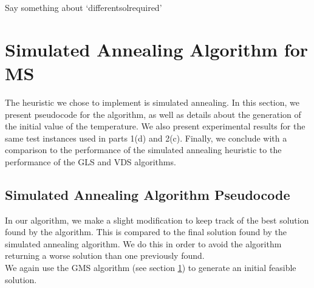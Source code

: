 \documentclass[12pt,a4paper,reqno]{article}
\begin{document}
Say something about `differentsolrequired'

\section{Simulated Annealing Algorithm for MS}

The heuristic we chose to implement is simulated annealing. In this section, we present pseudocode for the algorithm, as well as details about the generation of the initial value of the temperature. We also present experimental results for the same test instances used in parts 1(d) and 2(c). Finally, we conclude with a comparison to the performance of the simulated annealing heuristic to the performance of the GLS and VDS algorithms.

\subsection*{Simulated Annealing Algorithm Pseudocode}
In our algorithm, we make a slight modification to keep track of the best solution found by the algorithm. This is compared to the final solution found by the simulated annealing algorithm. We do this in order to avoid the algorithm returning a worse solution than one previously found. \\

We again use the GMS algorithm (see section \ref{}) to generate an initial feasible solution. \\
\end{document}

